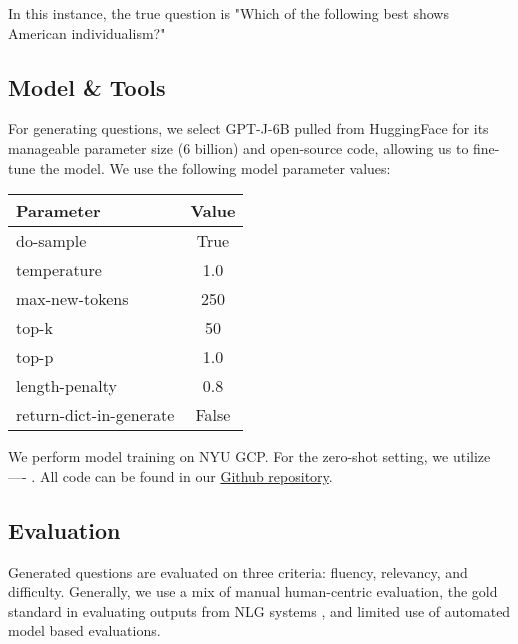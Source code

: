 \documentclass[11pt]{article}
\begin{document}
In this instance, the true question is "Which of the following best shows American individualism?"

\subsection{Model \& Tools}

For generating questions, we select GPT-J-6B \citep{gpt-j:4} pulled from HuggingFace for its manageable parameter size (6 billion) and open-source code, allowing us to fine-tune the model. We use the following model parameter values: 

\begin{table}[h]
\centering
\begin{tabular}{lc}
\hline
\textbf{Parameter} & \textbf{Value}\\
\hline
do-sample & True \\
temperature & 1.0 \\
max-new-tokens & 250 \\
top-k & 50 \\ 
top-p & 1.0  \\ 
length-penalty & 0.8 \\
return-dict-in-generate & False \\
\hline
\end{tabular}
\end{table}

We perform model training on NYU GCP. For the zero-shot setting, we utilize ---- . All code can be found in our \href{https://github.com/rbolline/Neural-Question-Generation-with-GPT-J}{Github repository}. 



\subsection{Evaluation}

Generated questions are evaluated on three criteria: fluency, relevancy, and difficulty. Generally, we use a mix of manual human-centric evaluation, the gold standard in evaluating outputs from NLG systems \citep{human-eval:7}, and limited use of automated model based evaluations.
\end{document}
